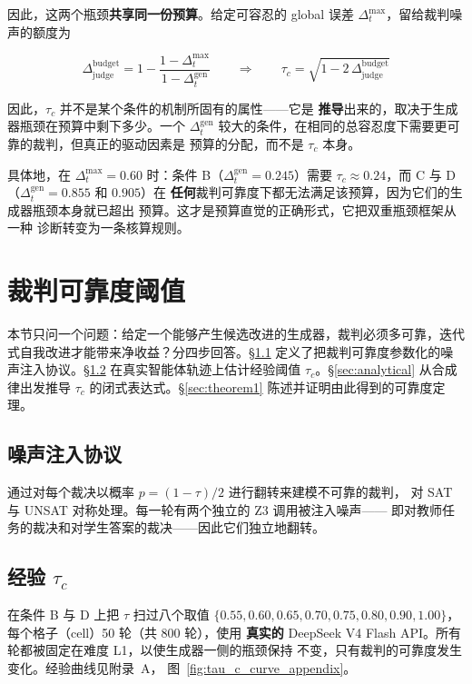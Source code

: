 \documentclass{article}
\begin{document}
因此，这两个瓶颈\textbf{共享同一份预算}。给定可容忍的 global 误差
$\Delta_t^{\max}$，留给裁判噪声的额度为

\[
  \Delta_{\mathrm{judge}}^{\mathrm{budget}} = 1 - \frac{1-\Delta_t^{\max}}{1-\Delta_t^{\mathrm{gen}}}
  \qquad\Longrightarrow\qquad
  \tau_c = \sqrt{1 - 2\,\Delta_{\mathrm{judge}}^{\mathrm{budget}}}
\]

因此，$\tau_c$ 并不是某个条件的机制所固有的属性——它是
\textbf{推导}出来的，取决于生成器瓶颈在预算中剩下多少。一个
$\Delta_t^{\mathrm{gen}}$ 较大的条件，在相同的总容忍度下需要更可靠的裁判，但真正的驱动因素是
预算的分配，而不是 $\tau_c$ 本身。

具体地，在 $\Delta_t^{\max} = 0.60$ 时：条件 B（$\Delta_t^{\mathrm{gen}} = 0.245$）需要
$\tau_c \approx 0.24$，而 C 与 D（$\Delta_t^{\mathrm{gen}} = 0.855$ 和 $0.905$）在
\textbf{任何}裁判可靠度下都无法满足该预算，因为它们的生成器瓶颈本身就已超出
预算。这才是预算直觉的正确形式，它把双重瓶颈框架从一种
诊断转变为一条核算规则。

\section{裁判可靠度阈值}
\label{sec:judge}

本节只问一个问题：给定一个能够产生候选改进的生成器，裁判必须多可靠，迭代式自我改进才能带来净收益？分四步回答。\S\ref{sec:noise} 定义了把裁判可靠度参数化的噪声注入协议。\S\ref{sec:empirical_tau} 在真实智能体轨迹上估计经验阈值 $\tau_c$。\S\ref{sec:analytical} 从合成律出发推导 $\tau_c$ 的闭式表达式。\S\ref{sec:theorem1} 陈述并证明由此得到的可靠度定理。

\subsection{噪声注入协议}
\label{sec:noise}

通过对每个裁决以概率 $p = (1-\tau)/2$ 进行翻转来建模不可靠的裁判，
对 SAT 与 UNSAT 对称处理。每一轮有两个独立的 Z3 调用被注入噪声——
即对教师任务的裁决和对学生答案的裁决——因此它们独立地翻转。

\subsection{经验 $\tau_c$}
\label{sec:empirical_tau}

在条件 B 与 D 上把 $\tau$ 扫过八个取值 $\{0.55, 0.60, 0.65, 0.70, 0.75, 0.80, 0.90, 1.00\}$，
每个格子（cell）50 轮（共 800 轮），使用 \textbf{真实的} DeepSeek V4
Flash API。所有轮都被固定在难度 L1，以使生成器一侧的瓶颈保持
不变，只有裁判的可靠度发生变化。经验曲线见附录~A，
图~\ref{fig:tau_c_curve_appendix}。
\end{document}
